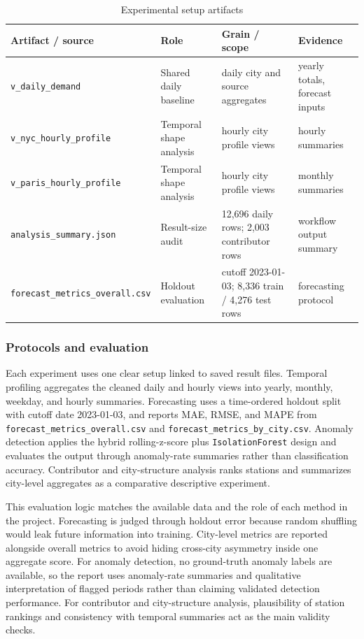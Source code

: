 \documentclass[10pt,twocolumn,a4paper]{article}
\begin{document}
\begin{table}[t]
\centering
\scriptsize
\caption{Experimental setup artifacts}
\renewcommand{\arraystretch}{1.08}
{\setlength{\tabcolsep}{3pt}
\begin{tabular}{@{}L{0.22\columnwidth}L{0.17\columnwidth}L{0.21\columnwidth}L{0.26\columnwidth}@{}}
\toprule
Artifact / source & Role & Grain / scope & Evidence \\
\midrule
\nolinkurl{v_daily_demand} & Shared daily baseline & daily city and source aggregates & yearly totals, forecast inputs \\
\nolinkurl{v_nyc_hourly_profile} & Temporal shape analysis & hourly city profile views & hourly summaries \\
\nolinkurl{v_paris_hourly_profile} & Temporal shape analysis & hourly city profile views & monthly summaries \\
\nolinkurl{analysis_summary.json} & Result-size audit & 12,696 daily rows; 2,003 contributor rows & workflow output summary \\
\nolinkurl{forecast_metrics_overall.csv} & Holdout evaluation & cutoff 2023-01-03; 8,336 train / 4,276 test rows & forecasting protocol \\
\bottomrule
\end{tabular}
}
\renewcommand{\arraystretch}{1}
\end{table}

\subsubsection{Protocols and evaluation}

Each experiment uses one clear setup linked to saved result files. Temporal
profiling aggregates the cleaned daily and hourly views into yearly, monthly,
weekday, and hourly summaries. Forecasting uses a time-ordered holdout split
with cutoff date 2023-01-03, and reports MAE, RMSE, and MAPE from
\texttt{forecast\_metrics\_overall.csv} and
\texttt{forecast\_metrics\_by\_city.csv}. Anomaly detection applies the hybrid
rolling-z-score plus \texttt{IsolationForest} design and evaluates the output
through anomaly-rate summaries rather than classification accuracy. Contributor
and city-structure analysis ranks stations and summarizes city-level aggregates
as a comparative descriptive experiment.

This evaluation logic matches the available data and the role of each method in
the project. Forecasting is judged through holdout error because random
shuffling would leak future information into training. City-level metrics are
reported alongside overall metrics to avoid hiding cross-city asymmetry inside
one aggregate score. For anomaly detection, no ground-truth anomaly labels are
available, so the report uses anomaly-rate summaries and qualitative
interpretation of flagged periods rather than claiming validated detection
performance. For contributor and city-structure analysis, plausibility of
station rankings and consistency with temporal summaries act as the main
validity checks.
\end{document}
